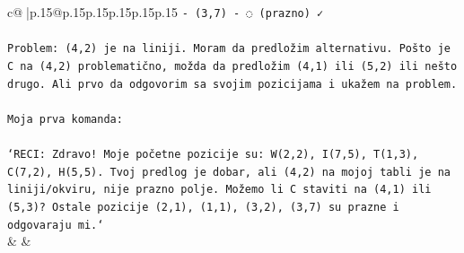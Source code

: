 \documentclass{article}
\begin{document}
{\begin{supertabular}{c@{$\;$}|p{.15\linewidth}@{}p{.15\linewidth}p{.15\linewidth}p{.15\linewidth}p{.15\linewidth}p{.15\linewidth}}
{{{\texttt{{-} (3,7) {-} ◌ (prazno) ✓} \\
\\ 
\texttt{Problem: (4,2) je na liniji. Moram da predložim alternativu. Pošto je C na (4,2) problematično, možda da predložim (4,1) ili (5,2) ili nešto drugo. Ali prvo da odgovorim sa svojim pozicijama i ukažem na problem.} \\
\\ 
\texttt{Moja prva komanda:} \\
\\ 
\texttt{`RECI: Zdravo! Moje početne pozicije su: W(2,2), I(7,5), T(1,3), C(7,2), H(5,5). Tvoj predlog je dobar, ali (4,2) na mojoj tabli je na liniji/okviru, nije prazno polje. Možemo li C staviti na (4,1) ili (5,3)? Ostale pozicije (2,1), (1,1), (3,2), (3,7) su prazne i odgovaraju mi.`} \\
            }
        }
    }
    & & \\ \\


\end{supertabular}}
\end{document}
